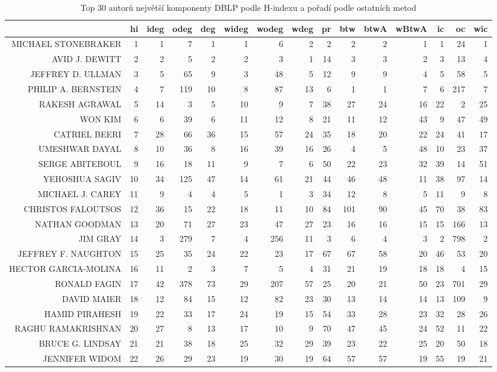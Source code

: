 \documentclass{bakalarka}
\begin{document}
\begin{table}[!ht]
\centering
\caption{Top 30 autorů největší komponenty DBLP podle H-indexu a pořadí podle ostatních metod}
\label{tab:ranks2}
\begin{sideways}
\begin{scriptsize}
\begin{tabular}{r|r|rrrrrrrrrrrrr}
\toprule
&hi&ideg&odeg&deg&wideg&wodeg&wdeg&pr&btw&btwA&wBtwA&ic&oc&wic\\
\midrule
MICHAEL STONEBRAKER&1&1&7&1&1&6&2&2&2&2&1&1&24&1\\
AVID J. DEWITT&2&2&5&2&2&3&1&14&3&3&2&3&13&4\\
JEFFREY D. ULLMAN&3&5&65&9&3&48&5&12&9&9&4&5&58&5\\
PHILIP A. BERNSTEIN&4&7&119&10&8&87&13&6&1&1&7&6&217&7\\
RAKESH AGRAWAL&5&14&3&5&10&9&7&38&27&24&16&22&2&25\\
WON KIM&6&6&39&6&11&12&8&21&11&12&43&9&47&49\\
CATRIEL BEERI&7&28&66&36&15&57&24&35&18&20&22&24&41&17\\
UMESHWAR DAYAL&8&10&36&8&16&39&16&26&4&5&48&10&23&37\\
SERGE ABITEBOUL&9&16&18&11&9&7&6&50&22&23&32&39&14&51\\
YEHOSHUA SAGIV&10&34&125&47&14&61&21&44&46&48&11&38&97&14\\
MICHAEL J. CAREY&11&9&4&4&5&1&3&34&12&8&5&11&9&8\\
CHRISTOS FALOUTSOS&12&36&15&22&18&11&10&84&101&90&45&70&38&83\\
NATHAN GOODMAN&13&20&71&27&23&47&27&23&16&16&15&15&166&13\\
JIM GRAY&14&3&279&7&4&256&11&3&6&4&3&2&798&2\\
JEFFREY F. NAUGHTON&15&25&35&24&22&23&17&67&67&58&20&46&53&20\\
HECTOR GARCIA-MOLINA&16&11&2&3&7&5&4&31&21&19&18&18&4&15\\
RONALD FAGIN&17&42&378&73&29&207&57&25&20&21&50&23&701&29\\
DAVID MAIER&18&12&84&15&12&82&23&30&13&14&14&13&109&9\\
HAMID PIRAHESH&19&22&33&17&24&19&15&54&33&28&23&32&28&26\\
RAGHU RAMAKRISHNAN&20&27&8&13&17&10&9&70&47&45&24&52&11&22\\
BRUCE G. LINDSAY&21&21&38&18&25&32&29&39&23&22&25&20&50&18\\
JENNIFER WIDOM&22&26&29&23&19&30&19&64&57&57&19&55&19&21\\

\end{tabular}
\end{scriptsize}
\end{sideways}
\end{table}
\end{document}
